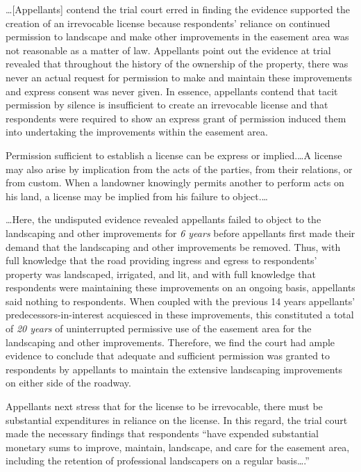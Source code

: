 \ldots [Appellants] contend the trial court erred in finding the evidence
supported the creation of an irrevocable license because respondents' reliance
on continued permission to landscape and make other improvements in the easement
area was not reasonable as a matter of law. Appellants point out the evidence at
trial revealed that throughout the history of the ownership of the property,
there was never an actual request for permission to make and maintain these
improvements and express consent was never given. In essence, appellants contend
that tacit permission by silence is insufficient to create an irrevocable
license and that respondents were required to show an express grant of
permission induced them into undertaking the improvements within the easement
area.

Permission sufficient to establish a license can be express or implied.\ldots A
license may also arise by implication from the acts of the parties, from their
relations, or from custom. When a landowner knowingly permits another to perform
acts on his land, a license may be implied from his failure to object.\ldots

\ldots Here, the undisputed evidence revealed appellants failed to object to the
landscaping and other improvements for \textit{6 years} before appellants first
made their demand that the landscaping and other improvements be removed. Thus,
with full knowledge that the road providing ingress and egress to respondents'
property was landscaped, irrigated, and lit, and with full knowledge that
respondents were maintaining these improvements on an ongoing basis, appellants
said nothing to respondents. When coupled with the previous 14 years appellants'
predecessors-in-interest acquiesced in these improvements, this constituted a
total of \textit{20 years} of uninterrupted permissive use of the easement area
for the landscaping and other improvements. Therefore, we find the court had
ample evidence to conclude that adequate and sufficient permission was granted
to respondents by appellants to maintain the extensive landscaping improvements
on either side of the roadway.

Appellants next stress that for the license to be irrevocable, there must be
substantial expenditures in reliance on the license. In this regard, the trial
court made the necessary findings that respondents ``have expended substantial
monetary sums to improve, maintain, landscape, and care for the easement area,
including the retention of professional landscapers on a regular basis\ldots.'' 

